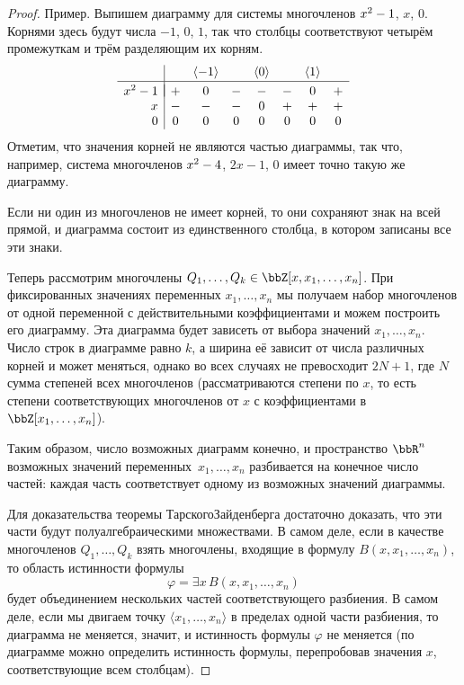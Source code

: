 \begin{proof}
\textsf{Пример}. Выпишем диаграмму
для системы многочленов $x^2\hm-1$, $x$, $0$. Корнями здесь будут числа
$-1$, $0$, $1$, так что столбцы соответствуют четырём промежуткам
и трём разделяющим их корням.
        $$
\begin{array}{r|ccccccc}
  \mathstrut&  & \langle -1\rangle &   & \langle 0\rangle & & \langle 1\rangle & \\[0.2ex]
\hline\\[-2.3ex]
x^2-1\mathstrut      & + & 0 & - & - & - & 0 & +\\
  x       & - & - & - & 0 & + & + & +\\
  0       & 0 & 0 & 0 & 0 & 0 & 0 & 0
\end{array}
        $$
Отметим, что значения корней не являются частью диаграммы, так
что, например, система многочленов $x^2\hm-4$, $2x-1$, $0$ имеет точно
такую же диаграмму.

Если ни один из многочленов не имеет корней, то они сохраняют
знак на всей прямой, и диаграмма состоит из единственного
столбца, в котором записаны все эти знаки.

Теперь рассмотрим многочлены
$Q_1,\dots,Q_k\hm\in\bbZ[x,x_1,\dots,x_n]$. При фиксированных
значениях переменных $x_1,\dots,x_n$ мы получаем набор
многочленов от одной переменной с действительными коэффициентами
и можем построить его диаграмму. Эта диаграмма будет зависеть от
выбора значений $x_1,\dots,x_n$. Число строк в диаграмме равно
$k$, а ширина её зависит от числа различных корней и может
меняться, однако во всех случаях не превосходит $2N+1$, где
$N$\т сумма степеней всех многочленов (рассматриваются степени
по $x$, то есть степени соответствующих многочленов от $x$ с
коэффициентами в~$\bbZ[x_1,\dots,x_n]$).

Таким образом, число возможных диаграмм конечно, и пространство
$\bbR^n$ возможных значений переменных~$x_1,\dots,x_n$
разбивается на конечное число частей: каждая часть соответствует
одному из возможных значений диаграммы.

Для доказательства теоремы Тарского\ч Зайденберга достаточно
доказать, что эти части будут полуалгебраическими множествами.
В самом деле, если в качестве многочленов $Q_1,\dots, Q_k$
взять многочлены, входящие в формулу $B(x,x_1,\dots,x_n)$,
то область истинности формулы
        $$
\varphi=\exists x\, B(x,x_1,\dots,x_n)
        $$
будет объединением нескольких частей соответствующего разбиения.
В самом деле, если мы двигаем точку $\langle x_1,\dots,x_n\rangle$
в пределах одной части разбиения, то диаграмма не меняется, значит,
и истинность формулы $\varphi$ не меняется (по диаграмме можно
определить истинность формулы, перепробовав значения $x$, соответствующие
всем столбцам).


\end{proof}
